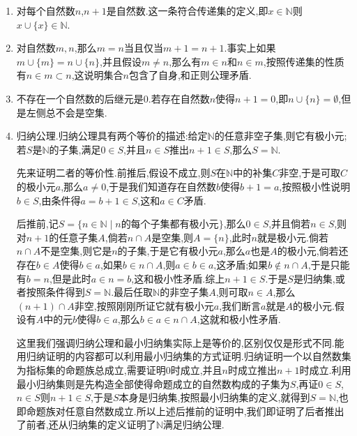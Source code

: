 \begin{enumerate}
	\item 对每个自然数$n$,$n+1$是自然数.这一条符合传递集的定义,即$x\in\mathbb{N}$则$x\cup\{x\}\in\mathbb{N}$.
	\item 对自然数$m,n$,那么$m=n$当且仅当$m+1=n+1$.事实上如果$m\cup\{m\}=n\cup\{n\}$,并且假设$m\not=n$,那么有$m\in n$和$n\in m$,按照传递集的性质有$n\in m\subset n$,这说明集合$n$包含了自身,和正则公理矛盾.
	\item 不存在一个自然数的后继元是0.若存在自然数$n$使得$n+1=0$,即$n\cup\{n\}=\emptyset$,但是左侧总不会是空集.
	\item 归纳公理.归纳公理具有两个等价的描述:给定$\mathbb{N}$的任意非空子集,则它有极小元;若$S$是$\mathbb{N}$的子集,满足$0\in S$,并且$n\in S$推出$n+1\in S$,那么$S=\mathbb{N}$.
	
	先来证明二者的等价性.前推后,假设不成立,则$S$在$\mathbb{N}$中的补集$C$非空,于是可取$C$的极小元$a$,那么$a\not=0$,于是我们知道存在自然数$b$使得$b+1=a$,按照极小性说明$b\in S$,由条件得$a=b+1\in S$,这和$a\in C$矛盾.
	
	后推前,记$S=\{n\in\mathbb{N}\mid n\text{的每个子集都有极小元}\}$,那么$0\in S$,并且倘若$n\in S$,则对$n+1$的任意子集$A$,倘若$n\cap A$是空集,则$A=\{n\}$,此时$n$就是极小元.倘若$n\cap A$不是空集,则它是$n$的子集,于是它有极小元$a$,那么$a$也是$A$的极小元,倘若还存在$b\in A$使得$b\in a$,如果$b\in n\cap A$,则$a\in b\in a$,这矛盾;如果$b\not\in n\cap A$,于是只能有$b=n$,但是此时$a\in n=b$,这和极小性矛盾.综上$n+1\in S$.于是$S$是归纳集,或者按照条件得到$S=\mathbb{N}$.最后任取$\mathbb{N}$的非空子集$A$,则可取$n\in A$,那么$(n+1)\cap A$非空,按照刚刚所证它就有极小元$a$,我们断言$a$就是$A$的极小元.假设有$A$中的元$b$使得$b\in a$,那么$b\in a\in n\cap A$,这就和极小性矛盾.
	
	这里我们强调归纳公理和最小归纳集实际上是等价的,区别仅仅是形式不同.能用归纳证明的内容都可以利用最小归纳集的方式证明.归纳证明一个以自然数集为指标集的命题族总成立,需要证明0时成立,并且$n$时成立推出$n+1$时成立.利用最小归纳集则是先构造全部使得命题成立的自然数构成的子集为$S$,再证$0\in S$,$n\in S$则$n+1\in S$,于是$S$本身是归纳集,按照最小归纳集的定义,就得到$S=\mathbb{N}$,也即命题族对任意自然数成立.所以上述后推前的证明中,我们即证明了后者推出了前者,还从归纳集的定义证明了$\mathbb{N}$满足归纳公理.
\end{enumerate}

